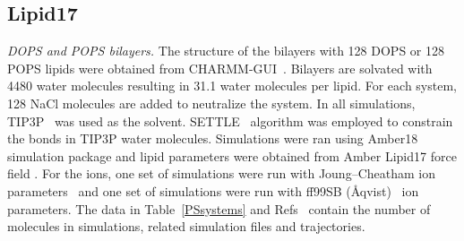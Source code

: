 \documentclass[journal=jpcbfk,manuscript=article]{achemso}
\begin{document}
\subsection{Lipid17}
{\it DOPS and POPS bilayers.} 
The structure of the bilayers with 128 DOPS or 128 POPS lipids were
obtained from CHARMM-GUI~\cite{lee16,jo18}. Bilayers are solvated with
4480 water molecules resulting in 31.1 water molecules per lipid. For
each system, 128 NaCl molecules are added to neutralize the system.
In all simulations, TIP3P~\cite{jorgensen1983comparison} was used as the solvent. SETTLE~\cite{miyamoto92} algorithm was employed 
to constrain the bonds in TIP3P water molecules. Simulations were ran using Amber18 simulation package \cite{amber18md}
and lipid parameters were obtained from Amber Lipid17 force field \cite{gould18}. For the ions, one set of simulations were run with Joung--Cheatham
ion parameters~\cite{joung2008determination} and one set of simulations were run with ff99SB (\AA{}qvist)~\cite{aqvist90} ion parameters.
The data in Table~\ref{PSsystems} and Refs~ contain
the number of molecules in simulations, related simulation files and trajectories.
\end{document}
